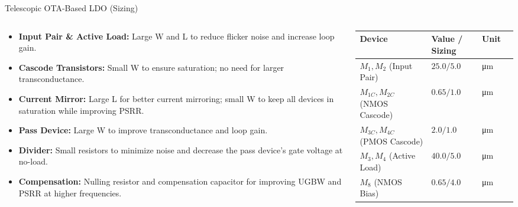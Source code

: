 \documentclass[10pt, aspectratio=169]{beamer}
\begin{document}
\begin{frame}{Telescopic OTA-Based LDO (Sizing)}
    \begin{columns}[T,onlytextwidth]
        \begin{column}{0.55\textwidth}
            \begin{itemize}
                \item \textbf{Input Pair \& Active Load:} Large W and L to reduce flicker noise and increase loop gain.
                \item \textbf{Cascode Transistors:} Small W to ensure saturation; no need for larger transconductance.
                \item \textbf{Current Mirror:} Large L for better current mirroring; small W to keep all devices in saturation while improving PSRR.
                \item \textbf{Pass Device:} Large W to improve transconductance and loop gain.
                \item \textbf{Divider:} Small resistors to minimize noise and decrease the pass device's gate voltage at no-load.
                \item \textbf{Compensation:} Nulling resistor and compensation capacitor for improving UGBW and PSRR at higher frequencies.
            \end{itemize}
        \end{column}
        \begin{column}{0.45\textwidth}
            \begin{table}[htbp]
                \scriptsize
                \centering
                \label{tab:sizing_tel}
                \begin{tabular}{@{}lllc@{}}
                    \toprule
                    \textbf{Device} & \textbf{Value / Sizing} & \textbf{Unit} \\
                    \midrule
                    $M_1, M_2$ (Input Pair) & $25.0 / 5.0$ & \unit{\micro\meter} \\
                    $M_{1C}, M_{2C}$ (NMOS Cascode) & $0.65 / 1.0$ & \unit{\micro\meter} \\
                    $M_{3C}, M_{4C}$ (PMOS Cascode) & $2.0 / 1.0$ & \unit{\micro\meter} \\
                    $M_3, M_4$ (Active Load) & $40.0 / 5.0$ & \unit{\micro\meter} \\
                    \midrule
                    $M_8$ (NMOS Bias) & $0.65 / 4.0$ & \unit{\micro\meter} \\

\end{tabular}
\end{table}
\end{column}
\end{columns}
\end{frame}
\end{document}
